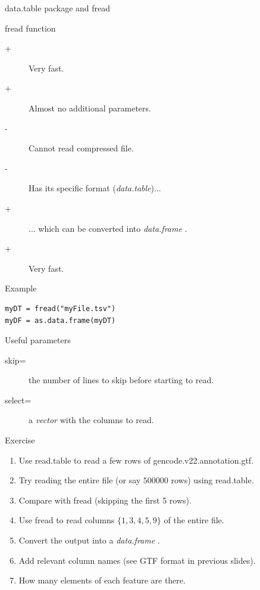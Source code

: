 \documentclass[10pt]{beamer}
\newcommand{\df}{{\it data.frame} }
\begin{document}
\begin{frame}[fragile]{{\sf data.table} package and {\sf fread}}
  \begin{block}{{\sf fread} function}
    \begin{description}
    \item[+] Very fast.
    \item[+] Almost no additional parameters.
    \item[-] Cannot read compressed file.
    \item[-] Has its specific format ({\it data.table})...
    \item[+] ... which can be converted into \df.
    \item[+] Very fast.
    \end{description}
  \end{block}
  \begin{exampleblock}{Example}
\begin{verbatim}
myDT = fread("myFile.tsv")
myDF = as.data.frame(myDT)
\end{verbatim}
  \end{exampleblock}
  \begin{block}{Useful parameters}
    \begin{description}
    \item[skip=] the number of lines to skip before starting to read.
    \item[select=] a {\it vector} with the columns to read.
    \end{description}
  \end{block}
\end{frame}

\begin{frame}{Exercise}
  \begin{enumerate}
  \item Use {\sf read.table} to read a few rows of {\sf gencode.v22.annotation.gtf}.
  \item Try reading the entire file (or say $500 000$ rows) using {\sf read.table}.
  \item Compare with {\sf fread} (skipping the first 5 rows).
    \bigskip
    \bigskip
  \item Use {\sf fread} to read columns $\{1,3,4,5,9\}$ of the entire file.
  \item Convert the output into a \df.
  \item Add relevant column names (see GTF format in previous slides).
    \bigskip
  \item How many elements of each feature are there.
  \end{enumerate}
\end{frame}
\end{document}
